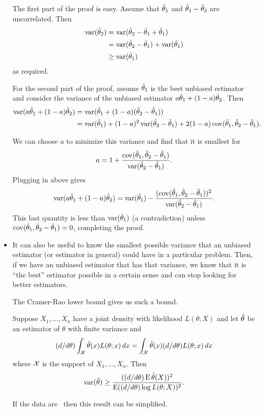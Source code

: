 \begin{itemize}[leftmargin=0pt]
  The first part of the proof is easy.  Assume that $\hat{\theta}_1$ and $\hat{\theta}_1 -
  \hat{\theta}_2$ are uncorrelated.  Then
  \begin{align*}
    \operatorname{var}(\hat{\theta}_2) &= \operatorname{var}(\hat{\theta}_2 - \hat{\theta}_1 + \hat{\theta}_1) \\
    &= \operatorname{var}(\hat{\theta}_2 - \hat{\theta}_1) + \operatorname{var}(\hat{\theta}_1) \\
    &\geq \operatorname{var}(\hat{\theta}_1)
  \end{align*}
  as required.

  For the second part of the proof, assume $\hat{\theta}_1$ is the best unbiased
  estimator and consider the variance of the unbiased estimator $a
  \hat{\theta}_1 + (1 - a) \hat{\theta}_2$.  Then
  \begin{align*}
    \operatorname{var}(a \hat{\theta}_1 + (1 - a) \hat{\theta}_2)
    &= \operatorname{var}(\hat{\theta}_1 + (1 - a) (\hat{\theta}_2 - \hat{\theta}_1)) \\
    &= \operatorname{var}(\hat{\theta}_1) + (1 - a)^2 \operatorname{var}(\hat{\theta}_2 - \hat{\theta}_1)
    + 2 (1 - a) \operatorname{cov}(\hat{\theta}_1, \hat{\theta}_2 - \hat{\theta}_1).
  \end{align*}

  We can choose $a$ to minimize this variance and find that it is
  smallest for
  \begin{equation*}
    a = 1 + \frac{\operatorname{cov}(\hat{\theta}_1, \hat{\theta}_2 - \hat{\theta}_1)}{\operatorname{var}(\hat{\theta}_2 - \hat{\theta}_1)}.
  \end{equation*}
  Plugging in above gives
  \begin{equation*}
    \operatorname{var}(a \hat{\theta}_1 + (1 - a) \hat{\theta}_2)
    = \operatorname{var}(\hat{\theta}_1) - \frac{(\operatorname{cov}(\hat{\theta}_1, \hat{\theta}_2 - \hat{\theta}_1))^2}{\operatorname{var}(\hat{\theta}_2 - \hat{\theta}_1)}.
  \end{equation*}
  This last quantity is less than $\operatorname{var}(\hat{\theta}_1)$ (a contradiction)
  unless $\operatorname{cov}(\hat{\theta}_1, \hat{\theta}_2 - \hat{\theta}_1) = 0$, completing the proof.

\item It can also be useful to know the smallest possible variance
  that an unbiased estimator (or estimator in general) could have in a
  particular problem.  Then, if we have an unbiased estimator that has
  that variance, we know that it is ``the best'' estimator possible in
  a certain sense and can stop looking for better estimators.

  The Cramer-Rao lower bound gives us such a bound.
  \begin{thm}
    Suppose $X_1,...,X_n$ have a joint density with likelihood $L(\theta;
    X)$ and let $\hat{\theta}$ be an estimator of $\theta$ with finite variance and
    \begin{equation*}
      (d/d\theta) \int_{\mathcal{X}} \hat{\theta}(x) L(\theta; x) \,dx = \int_{\mathcal{X}} \hat{\theta}(x) (d/d\theta) L(\theta; x) \,dx
    \end{equation*}
    where $\mathcal{X}$ is the support of $X_1,...,X_n$.
    Then 
    \begin{equation*}
      \operatorname{var}(\hat{\theta}) \geq  \frac{((d/d\theta) \operatorname{E} \hat{\theta}(X))^2}{\operatorname{E} ((d/d\theta) \log L(\theta; X))^2}.
    \end{equation*}
  \end{thm}
  If the data are \iid\ then this result can be simplified.


\end{itemize}
